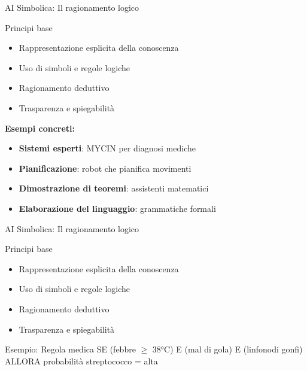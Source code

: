 \documentclass[aspectratio=169,12pt]{beamer}
\begin{document}
\begin{frame}{AI Simbolica: Il ragionamento logico}
    \begin{block}{Principi base}
        \begin{itemize}
            \item Rappresentazione esplicita della conoscenza
            \item Uso di simboli e regole logiche
            \item Ragionamento deduttivo
            \item Trasparenza e spiegabilità
        \end{itemize}
    \end{block}
    
    \textbf{Esempi concreti:}
    \begin{itemize}
        \item \textbf{Sistemi esperti}: MYCIN per diagnosi mediche
        \item \textbf{Pianificazione}: robot che pianifica movimenti
        \item \textbf{Dimostrazione di teoremi}: assistenti matematici
        \item \textbf{Elaborazione del linguaggio}: grammatiche formali
    \end{itemize}
\end{frame}
%
%
\begin{frame}{AI Simbolica: Il ragionamento logico}
    \begin{block}{Principi base}
        \begin{itemize}
            \item Rappresentazione esplicita della conoscenza
            \item Uso di simboli e regole logiche
            \item Ragionamento deduttivo
            \item Trasparenza e spiegabilità
        \end{itemize}
    \end{block}
    
    \vspace{0.3cm}
    
    \begin{exampleblock}{Esempio: Regola medica}
        SE (febbre $\ge$  38°C) E (mal di gola) E (linfonodi gonfi)\\
        ALLORA probabilità streptococco = alta
    \end{exampleblock}
\end{frame}
\end{document}
